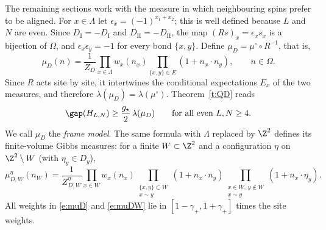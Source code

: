 The remaining sections work with the measure in which neighbouring spins prefer to be aligned. For $x \in \Lambda$ let $\epsilon_x = (-1)^{x_1 + x_2}$; this is well defined because $L$ and $N$ are even. Since $D_{\mathrm I} = -D_{\mathrm I}$ and $D_{\mathrm{II}} = -D_{\mathrm{II}}$, the map $(R s)_x = \epsilon_x s_x$ is a bijection of $\Omega$, and $\epsilon_x \epsilon_y = -1$ for every bond $\{x, y\}$. Define $\mu_D = \mu^\circ \circ R^{-1}$, that is,
\begin{equation}\label{e:muD}
\mu_D(n) = \frac{1}{Z_D} \prod_{x \in \Lambda} w_x(n_x) \prod_{\{x, y\} \in E} (1 + n_x \cdot n_y), \qquad n \in \Omega .
\end{equation}
Since $R$ acts site by site, it intertwines the conditional expectations $E_x$ of the two measures, and therefore $\lambda(\mu_D) = \lambda(\mu^\circ)$. Theorem~\ref{t:QD} reads
\begin{equation}\label{e:QDrot}
\gap(H_{L, N}) \ge \frac{g_\star}{2} \, \lambda(\mu_D) \qquad \text{for all even } L, N \ge 4 .
\end{equation}
We call $\mu_D$ the \emph{frame model}. The same formula with $\Lambda$ replaced by $\Z^2$ defines its finite-volume Gibbs measures: for a finite $W \subset \Z^2$ and a configuration $\eta$ on $\Z^2 \setminus W$ (with $\eta_y \in D_y$),
\begin{equation}\label{e:muDW}
\mu^{\eta}_{D, W}(n_W) = \frac{1}{Z^\eta_{D, W}} \prod_{x \in W} w_x(n_x) \prod_{\substack{\{x, y\} \subset W \\ x \sim y}} (1 + n_x \cdot n_y) \prod_{\substack{x \in W, \, y \notin W \\ x \sim y}} (1 + n_x \cdot \eta_y) .
\end{equation}
All weights in \eqref{e:muD} and \eqref{e:muDW} lie in $[1 - \gamma_+, 1 + \gamma_+]$ times the site weights.
